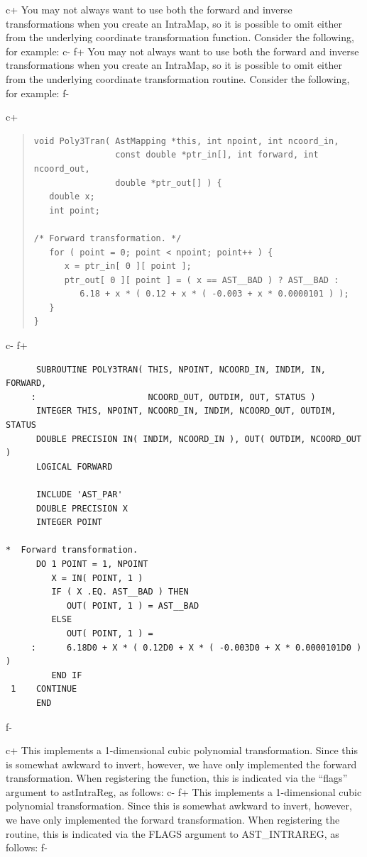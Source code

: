 \documentclass[twoside,11pt]{article}
\begin{document}
c+
You may not always want to use both the forward and inverse
transformations when you create an IntraMap, so it is possible to omit
either from the underlying coordinate transformation
function. Consider the following, for example:
c-
f+
You may not always want to use both the forward and inverse
transformations when you create an IntraMap, so it is possible to omit
either from the underlying coordinate transformation routine. Consider
the following, for example:
f-

c+
\begin{quote}
\small
\begin{verbatim}
void Poly3Tran( AstMapping *this, int npoint, int ncoord_in,
                const double *ptr_in[], int forward, int ncoord_out,
                double *ptr_out[] ) {
   double x;
   int point;

/* Forward transformation. */
   for ( point = 0; point < npoint; point++ ) {
      x = ptr_in[ 0 ][ point ];
      ptr_out[ 0 ][ point ] = ( x == AST__BAD ) ? AST__BAD :
         6.18 + x * ( 0.12 + x * ( -0.003 + x * 0.0000101 ) );
   }
}
\end{verbatim}
\normalsize
\end{quote}
c-
f+
\small
\begin{verbatim}
      SUBROUTINE POLY3TRAN( THIS, NPOINT, NCOORD_IN, INDIM, IN, FORWARD,
     :                      NCOORD_OUT, OUTDIM, OUT, STATUS )
      INTEGER THIS, NPOINT, NCOORD_IN, INDIM, NCOORD_OUT, OUTDIM, STATUS
      DOUBLE PRECISION IN( INDIM, NCOORD_IN ), OUT( OUTDIM, NCOORD_OUT )
      LOGICAL FORWARD

      INCLUDE 'AST_PAR'
      DOUBLE PRECISION X
      INTEGER POINT

*  Forward transformation.
      DO 1 POINT = 1, NPOINT
         X = IN( POINT, 1 )
         IF ( X .EQ. AST__BAD ) THEN
            OUT( POINT, 1 ) = AST__BAD
         ELSE
            OUT( POINT, 1 ) =
     :      6.18D0 + X * ( 0.12D0 + X * ( -0.003D0 + X * 0.0000101D0 ) )
         END IF
 1    CONTINUE
      END
\end{verbatim}
\normalsize
f-

c+
This implements a 1-dimensional cubic polynomial transformation. Since
this is somewhat awkward to invert, however, we have only implemented
the forward transformation.  When registering the function, this is
indicated via the ``flags'' argument to astIntraReg, as follows:
c-
f+
This implements a 1-dimensional cubic polynomial transformation. Since
this is somewhat awkward to invert, however, we have only implemented
the forward transformation.  When registering the routine, this is
indicated via the FLAGS argument to AST\_INTRAREG, as follows:
f-
\end{document}

